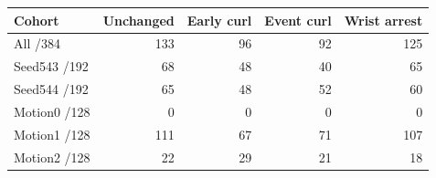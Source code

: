 \begin{tabular}{lrrrr}
\toprule
Cohort & Unchanged & Early curl & Event curl & Wrist arrest\\
\midrule
All /384 & 133 & 96 & 92 & 125\\
Seed543 /192 & 68 & 48 & 40 & 65\\
Seed544 /192 & 65 & 48 & 52 & 60\\
Motion0 /128 & 0 & 0 & 0 & 0\\
Motion1 /128 & 111 & 67 & 71 & 107\\
Motion2 /128 & 22 & 29 & 21 & 18\\
\bottomrule
\end{tabular}
